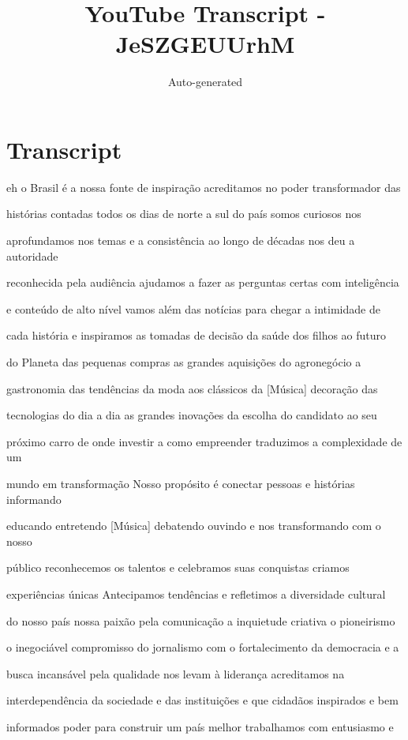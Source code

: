 \documentclass[a4paper,12pt]{article}
\title{YouTube Transcript - JeSZGEUUrhM}
\author{Auto-generated}
\date{}
\begin{document}
\maketitle

\section*{Transcript}

eh o Brasil é a nossa fonte de inspiração acreditamos no poder transformador das

histórias contadas todos os dias de norte a sul do país somos curiosos nos

aprofundamos nos temas e a consistência ao longo de décadas nos deu a autoridade

reconhecida pela audiência ajudamos a fazer as perguntas certas com inteligência

e conteúdo de alto nível vamos além das notícias para chegar a intimidade de

cada história e inspiramos as tomadas de decisão da saúde dos filhos ao futuro

do Planeta das pequenas compras as grandes aquisições do agronegócio a

gastronomia das tendências da moda aos clássicos da [Música] decoração das

tecnologias do dia a dia as grandes inovações da escolha do candidato ao seu

próximo carro de onde investir a como empreender traduzimos a complexidade de um

mundo em transformação Nosso propósito é conectar pessoas e histórias informando

educando entretendo [Música] debatendo ouvindo e nos transformando com o nosso

público reconhecemos os talentos e celebramos suas conquistas criamos

experiências únicas Antecipamos tendências e refletimos a diversidade cultural

do nosso país nossa paixão pela comunicação a inquietude criativa o pioneirismo

o inegociável compromisso do jornalismo com o fortalecimento da democracia e a

busca incansável pela qualidade nos levam à liderança acreditamos na

interdependência da sociedade e das instituições e que cidadãos inspirados e bem

informados poder para construir um país melhor trabalhamos com entusiasmo e
\end{document}
